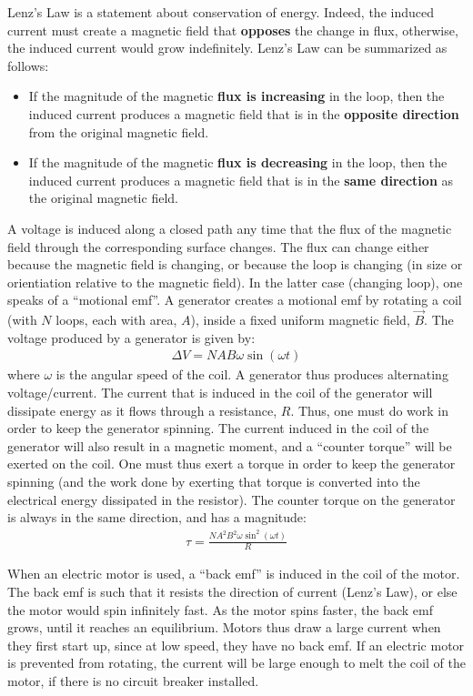 \begin{chapterSummary}
Lenz's Law is a statement about conservation of energy. Indeed, the induced current must create a magnetic field that \textbf{opposes} the change in flux, otherwise, the induced current would grow indefinitely. Lenz's Law can be summarized as follows:
\begin{itemize}
\item If the magnitude of the magnetic \textbf{flux is increasing} in the loop, then the induced current produces a magnetic field that is in the \textbf{opposite direction} from the original magnetic field.
\item If the magnitude of the magnetic \textbf{flux is decreasing} in the loop, then the induced current produces a magnetic field that is in the \textbf{same direction} as the original magnetic field.
\end{itemize}

A voltage is induced along a closed path any time that the flux of the magnetic field through the corresponding surface changes. The flux can change either because the magnetic field is changing, or because the loop is changing (in size or orientiation relative to the magnetic field). In the latter case (changing loop), one speaks of a ``motional emf''. A generator creates a motional emf by rotating a coil (with $N$ loops, each with area, $A$), inside a fixed uniform magnetic field, $\vec B$. The voltage produced by a generator is given by:
\begin{align*}
\Delta V = NAB\omega\sin(\omega t)
\end{align*}
where $\omega$ is the angular speed of the coil. A generator thus produces alternating voltage/current. The current that is induced in the coil of the generator will dissipate energy as it flows through a resistance, $R$. Thus, one must do work in order to keep the generator spinning. The current induced in the coil of the generator will also result in a magnetic moment, and a ``counter torque'' will be exerted on the coil. One must thus exert a torque in order to keep the generator spinning (and the work done by exerting that torque is converted into the electrical energy dissipated in the resistor). The counter torque on the generator is always in the same direction, and has a magnitude:
\begin{align*}
\tau = \frac{NA^2B^2\omega\sin^2(\omega t)}{R}
\end{align*}

When an electric motor is used, a ``back emf'' is induced in the coil of the motor. The back emf is such that it resists the direction of current (Lenz's Law), or else the motor would spin infinitely fast. As the motor spins faster, the back emf grows, until it reaches an equilibrium. Motors thus draw a large current when they first start up, since at low speed, they have no back emf. If an electric motor is prevented from rotating, the current will be large enough to melt the coil of the motor, if there is no circuit breaker installed.


\end{chapterSummary}
